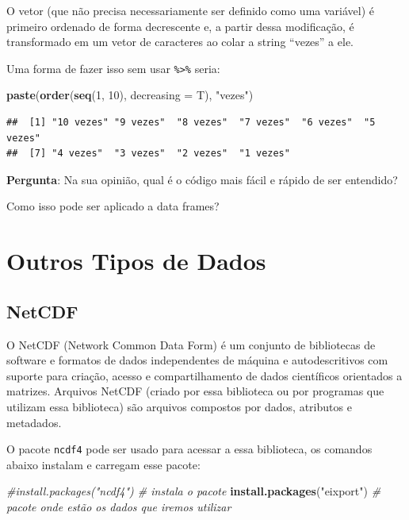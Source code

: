 \documentclass[]{book}
\newenvironment{Shaded}{\begin{snugshade}}{\end{snugshade}}
\newcommand{\KeywordTok}[1]{\textcolor[rgb]{0.13,0.29,0.53}{\textbf{#1}}}
\newcommand{\DataTypeTok}[1]{\textcolor[rgb]{0.13,0.29,0.53}{#1}}
\newcommand{\DecValTok}[1]{\textcolor[rgb]{0.00,0.00,0.81}{#1}}
\newcommand{\StringTok}[1]{\textcolor[rgb]{0.31,0.60,0.02}{#1}}
\newcommand{\CommentTok}[1]{\textcolor[rgb]{0.56,0.35,0.01}{\textit{#1}}}
\newcommand{\NormalTok}[1]{#1}
\theoremstyle{definition}
\theoremstyle{definition}
\theoremstyle{definition}
\theoremstyle{remark}
\begin{document}
O vetor (que não precisa necessariamente ser definido como uma variável)
é primeiro ordenado de forma decrescente e, a partir dessa modificação,
é transformado em um vetor de caracteres ao colar a string ``vezes'' a
ele.

Uma forma de fazer isso sem usar \texttt{\%\textgreater{}\%} seria:

\begin{Shaded}
\begin{Highlighting}[]
\KeywordTok{paste}\NormalTok{(}\KeywordTok{order}\NormalTok{(}\KeywordTok{seq}\NormalTok{(}\DecValTok{1}\NormalTok{, }\DecValTok{10}\NormalTok{), }\DataTypeTok{decreasing =}\NormalTok{ T), }\StringTok{"vezes"}\NormalTok{)}
\end{Highlighting}
\end{Shaded}

\begin{verbatim}
##  [1] "10 vezes" "9 vezes"  "8 vezes"  "7 vezes"  "6 vezes"  "5 vezes" 
##  [7] "4 vezes"  "3 vezes"  "2 vezes"  "1 vezes"
\end{verbatim}

{\textbf{Pergunta}: Na sua opinião, qual é o código mais fácil e rápido
de ser entendido?}

Como isso pode ser aplicado a data frames?

\section{Outros Tipos de Dados}\label{outros-tipos-de-dados}

\subsection{NetCDF}\label{netcdf}

O NetCDF (Network Common Data Form) é um conjunto de bibliotecas de
software e formatos de dados independentes de máquina e autodescritivos
com suporte para criação, acesso e compartilhamento de dados científicos
orientados a matrizes. Arquivos NetCDF (criado por essa biblioteca ou
por programas que utilizam essa biblioteca) são arquivos compostos por
dados, atributos e metadados.

O pacote \texttt{ncdf4} pode ser usado para acessar a essa biblioteca,
os comandos abaixo instalam e carregam esse pacote:

\begin{Shaded}
\begin{Highlighting}[]
\CommentTok{#install.packages("ncdf4")  # instala o pacote}
\KeywordTok{install.packages}\NormalTok{(}\StringTok{"eixport"}\NormalTok{) }\CommentTok{# pacote onde estão os dados que iremos utilizar}
\end{Highlighting}
\end{Shaded}
\end{document}
